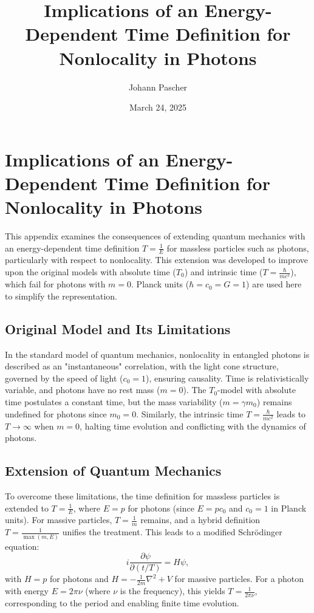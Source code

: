 \documentclass[a4paper,12pt]{article}
\begin{document}
	
	\title{Implications of an Energy-Dependent Time Definition for Nonlocality in Photons}
	\author{Johann Pascher}
	\date{March 24, 2025}
	\maketitle
	
	\tableofcontents %
	\newpage %
	
	\section{Implications of an Energy-Dependent Time Definition for Nonlocality in Photons}
	This appendix examines the consequences of extending quantum mechanics with an energy-dependent time definition \( T = \frac{1}{E} \) for massless particles such as photons, particularly with respect to nonlocality. This extension was developed to improve upon the original models with absolute time (\( T_0 \)) and intrinsic time (\( T = \frac{\hbar}{m c^2} \)), which fail for photons with \( m = 0 \). Planck units (\( \hbar = c_0 = G = 1 \)) are used here to simplify the representation.
	
	\subsection{Original Model and Its Limitations}
	In the standard model of quantum mechanics, nonlocality in entangled photons is described as an "instantaneous" correlation, with the light cone structure, governed by the speed of light (\( c_0 = 1 \)), ensuring causality. Time is relativistically variable, and photons have no rest mass (\( m = 0 \)). The \( T_0 \)-model with absolute time postulates a constant time, but the mass variability (\( m = \gamma m_0 \)) remains undefined for photons since \( m_0 = 0 \). Similarly, the intrinsic time \( T = \frac{\hbar}{m c^2} \) leads to \( T \to \infty \) when \( m = 0 \), halting time evolution and conflicting with the dynamics of photons.
	
	\subsection{Extension of Quantum Mechanics}
	To overcome these limitations, the time definition for massless particles is extended to \( T = \frac{1}{E} \), where \( E = p \) for photons (since \( E = p c_0 \) and \( c_0 = 1 \) in Planck units). For massive particles, \( T = \frac{1}{m} \) remains, and a hybrid definition \( T = \frac{1}{\max(m, E)} \) unifies the treatment. This leads to a modified Schrödinger equation:
	\[
	i \frac{\partial \psi}{\partial (t/T)} = H \psi,
	\]
	with \( H = p \) for photons and \( H = -\frac{1}{2m} \nabla^2 + V \) for massive particles. For a photon with energy \( E = 2\pi \nu \) (where \( \nu \) is the frequency), this yields \( T = \frac{1}{2\pi \nu} \), corresponding to the period and enabling finite time evolution.
	
\end{document}
